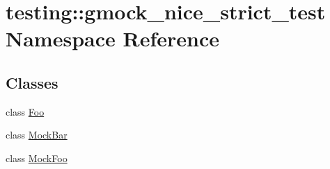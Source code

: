\hypertarget{namespacetesting_1_1gmock__nice__strict__test}{}\section{testing\+:\+:gmock\+\_\+nice\+\_\+strict\+\_\+test Namespace Reference}
\label{namespacetesting_1_1gmock__nice__strict__test}
\subsection*{Classes}
\begin{DoxyCompactItemize}
\item 
class \hyperlink{classtesting_1_1gmock__nice__strict__test_1_1_foo}{Foo}
\item 
class \hyperlink{classtesting_1_1gmock__nice__strict__test_1_1_mock_bar}{Mock\+Bar}
\item 
class \hyperlink{classtesting_1_1gmock__nice__strict__test_1_1_mock_foo}{Mock\+Foo}
\end{DoxyCompactItemize}
